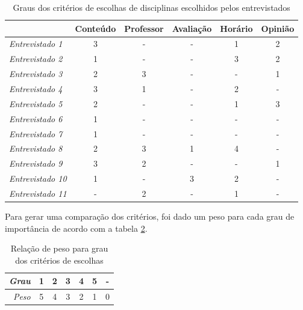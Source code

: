 \begin{table}[!ht]
    \begin{center}
        \begin{tabular}{ l|c|c|c|c|c } 
            & Conteúdo & Professor & Avaliação & Horário & Opinião \\ 
            \hline 
            \textit{Entrevistado 1 } & 3 & - & - & 1 & 2 \\     %
            \textit{Entrevistado 2 } & 1 & - & - & 3 & 2 \\     %
            \textit{Entrevistado 3 } & 2 & 3 & - & - & 1 \\     %
            \textit{Entrevistado 4 } & 3 & 1 & - & 2 & - \\     %
            \textit{Entrevistado 5 } & 2 & - & - & 1 & 3 \\     %
            \textit{Entrevistado 6 } & 1 & - & - & - & - \\     %
            \textit{Entrevistado 7 } & 1 & - & - & - & - \\     %
            \textit{Entrevistado 8 } & 2 & 3 & 1 & 4 & - \\     %
            \textit{Entrevistado 9 } & 3 & 2 & - & - & 1 \\     %
            \textit{Entrevistado 10} & 1 & - & 3 & 2 & - \\     %
            \textit{Entrevistado 11} & - & 2 & - & 1 & - \\     %
        \end{tabular}
    \end{center}
    \caption{Graus dos critérios de escolhas de disciplinas escolhidos pelos 
    entrevistados}
    
    \label{tab:entrevista-criterios-raw}
\end{table}

Para gerar uma comparação dos critérios, foi dado um peso para cada grau de importância de acordo com a tabela \ref{tab:grau-peso}.

\begin{table}[!ht]
    \begin{center}
        \begin{tabular}{ r||c|c|c|c|c|c } 
            \textit{Grau} & 1 & 2 & 3 & 4 & 5 & - \\
            \hline 
            \textit{Peso} & 5 & 4 & 3 & 2 & 1 & 0 \\
        \end{tabular}
    \end{center}
    \caption{Relação de peso para grau dos critérios de escolhas}
    \label{tab:grau-peso}
\end{table}

